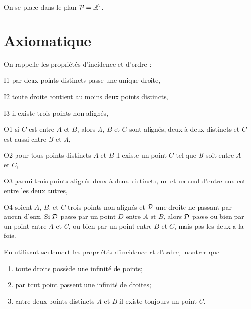 \documentclass[a4paper,11pt,reqno]{amsart}
\begin{document}

\begin{convention}
  On se place dans le plan $\mathcal{P}=\mathbb{R}^2$.
\end{convention}


\section{Axiomatique}

On rappelle les propriétés d'incidence et d'ordre :\\[-1.7\baselineskip]
\begin{multicols}{2}\small
  \begin{axioms}[leftmargin=3.5em]
    \item[I1] par deux points distincts passe une unique droite,
    \item[I2] toute droite contient au moins deux points distincts,
    \item[I3] il existe trois points non alignés,
    \item[O1] si $C$ est entre $A$ et $B$, alors $A$, $B$ et $C$ sont alignés, deux à deux distincts et $C$ est aussi entre $B$ et $A$,
    \item[O2] pour tous points distincts $A$ et $B$ il existe un point $C$ tel que $B$ soit entre $A$ et $C$,
    \item[O3] parmi trois points alignés deux à deux distincts, un et un seul d'entre eux est entre les deux autres,
    \item[O4] soient $A$, $B$, et $C$ trois points non alignés et $\mathcal{D}$ une droite ne passant par aucun d'eux. Si $\mathcal{D}$ passe par un point $D$ entre $A$ et $B$, alors $\mathcal{D}$ passe ou bien par un point entre $A$ et $C$, ou bien par un point entre $B$ et $C$, mais pas les deux à la fois.
  \end{axioms}
\end{multicols}\vspace{7pt}

\begin{exo}

  En utilisant seulement les propriétés d'incidence et d'ordre, montrer que
  \begin{enumerate}
    \item toute droite possède une infinité de points;
    \item par tout point passent une infinité de droites;
    \item entre deux points distincts $A$ et $B$ il existe toujours un point $C$.
  \end{enumerate}
\end{exo}
\end{document}

